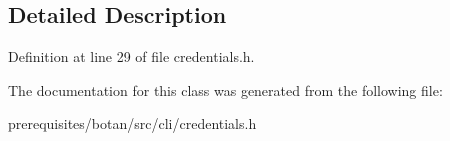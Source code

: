 \subsection{Detailed Description}


Definition at line 29 of file credentials.\+h.



The documentation for this class was generated from the following file\+:\begin{DoxyCompactItemize}
\item 
prerequisites/botan/src/cli/credentials.\+h\end{DoxyCompactItemize}
